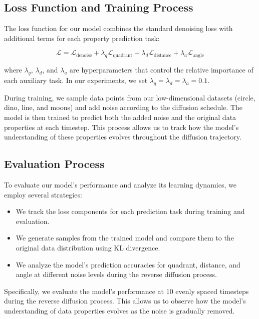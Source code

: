 \documentclass{article} %
\begin{document}
\subsection{Loss Function and Training Process}

The loss function for our model combines the standard denoising loss with additional terms for each property prediction task:

\begin{equation}
    \mathcal{L} = \mathcal{L}_\text{denoise} + \lambda_q \mathcal{L}_\text{quadrant} + \lambda_d \mathcal{L}_\text{distance} + \lambda_a \mathcal{L}_\text{angle}
\end{equation}

where $\lambda_q$, $\lambda_d$, and $\lambda_a$ are hyperparameters that control the relative importance of each auxiliary task. In our experiments, we set $\lambda_q = \lambda_d = \lambda_a = 0.1$.

During training, we sample data points from our low-dimensional datasets (circle, dino, line, and moons) and add noise according to the diffusion schedule. The model is then trained to predict both the added noise and the original data properties at each timestep. This process allows us to track how the model's understanding of these properties evolves throughout the diffusion trajectory.

\subsection{Evaluation Process}

To evaluate our model's performance and analyze its learning dynamics, we employ several strategies:

\begin{itemize}
    \item We track the loss components for each prediction task during training and evaluation.
    \item We generate samples from the trained model and compare them to the original data distribution using KL divergence.
    \item We analyze the model's prediction accuracies for quadrant, distance, and angle at different noise levels during the reverse diffusion process.
\end{itemize}

Specifically, we evaluate the model's performance at 10 evenly spaced timesteps during the reverse diffusion process. This allows us to observe how the model's understanding of data properties evolves as the noise is gradually removed.
\end{document}
